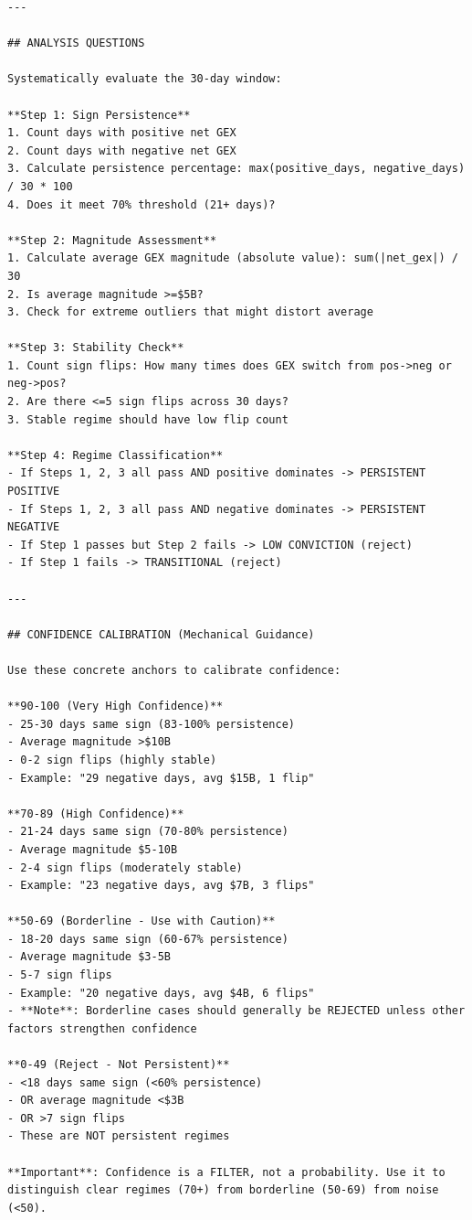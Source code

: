 \begin{lstlisting}[style=prompt]
---

## ANALYSIS QUESTIONS

Systematically evaluate the 30-day window:

**Step 1: Sign Persistence**
1. Count days with positive net GEX
2. Count days with negative net GEX
3. Calculate persistence percentage: max(positive_days, negative_days) / 30 * 100
4. Does it meet 70% threshold (21+ days)?

**Step 2: Magnitude Assessment**
1. Calculate average GEX magnitude (absolute value): sum(|net_gex|) / 30
2. Is average magnitude >=$5B?
3. Check for extreme outliers that might distort average

**Step 3: Stability Check**
1. Count sign flips: How many times does GEX switch from pos->neg or neg->pos?
2. Are there <=5 sign flips across 30 days?
3. Stable regime should have low flip count

**Step 4: Regime Classification**
- If Steps 1, 2, 3 all pass AND positive dominates -> PERSISTENT POSITIVE
- If Steps 1, 2, 3 all pass AND negative dominates -> PERSISTENT NEGATIVE
- If Step 1 passes but Step 2 fails -> LOW CONVICTION (reject)
- If Step 1 fails -> TRANSITIONAL (reject)

---

## CONFIDENCE CALIBRATION (Mechanical Guidance)

Use these concrete anchors to calibrate confidence:

**90-100 (Very High Confidence)**
- 25-30 days same sign (83-100% persistence)
- Average magnitude >$10B
- 0-2 sign flips (highly stable)
- Example: "29 negative days, avg $15B, 1 flip"

**70-89 (High Confidence)**
- 21-24 days same sign (70-80% persistence)
- Average magnitude $5-10B
- 2-4 sign flips (moderately stable)
- Example: "23 negative days, avg $7B, 3 flips"

**50-69 (Borderline - Use with Caution)**
- 18-20 days same sign (60-67% persistence)
- Average magnitude $3-5B
- 5-7 sign flips
- Example: "20 negative days, avg $4B, 6 flips"
- **Note**: Borderline cases should generally be REJECTED unless other factors strengthen confidence

**0-49 (Reject - Not Persistent)**
- <18 days same sign (<60% persistence)
- OR average magnitude <$3B
- OR >7 sign flips
- These are NOT persistent regimes

**Important**: Confidence is a FILTER, not a probability. Use it to distinguish clear regimes (70+) from borderline (50-69) from noise (<50).


\end{lstlisting}
